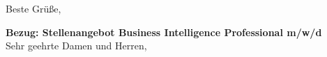 


%



\clearpage
\date{\today} %
\opening{} %
\closing{Beste Gr\"u\ss e,} %

\makelettertitle %
\vspace{2cm}
\textbf{Bezug: Stellenangebot Business Intelligence Professional m/w/d}\\
\vspace{1cm}
Sehr geehrte Damen und Herren, \\
\vspace{0.5cm}

